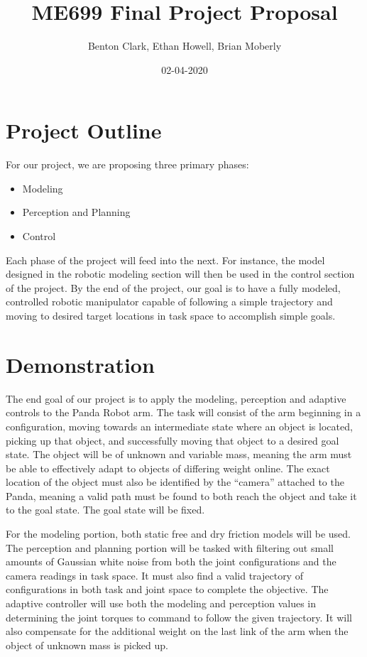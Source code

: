\documentclass{article}
\title{ME699 Final Project Proposal}
\date{02-04-2020}
\author{Benton Clark, Ethan Howell, Brian Moberly}
\begin{document}
\maketitle

\section{Project Outline}
For our project, we are proposing three primary phases:

\begin{itemize}
  \item Modeling
  \item Perception and Planning
  \item Control
\end{itemize}

\noindent Each phase of the project will feed into the next.
For instance, the model designed in the robotic modeling section will then be
used in the control section of the project.
By the end of the project, our goal is to have a fully modeled, controlled
robotic manipulator capable of following a simple trajectory and moving to
desired target locations in task space to accomplish simple goals.

\section{Demonstration}
The end goal of our project is to apply the modeling, perception and adaptive
controls to the Panda Robot arm.
The task will consist of the arm beginning in a configuration, moving towards an
intermediate state where an object is located, picking up that object, and
successfully moving that object to a desired goal state.
The object will be of unknown and variable mass, meaning the arm must be able to
effectively adapt to objects of differing weight online.
The exact location of the object must also be identified by the ``camera''
attached to the Panda, meaning a valid path must be found to both reach the
object and take it to the goal state.
The goal state will be fixed.

For the modeling portion, both static free and dry friction models will be used.
The perception and planning portion will be tasked with filtering out small
amounts of Gaussian white noise from both the joint configurations and the
camera readings in task space.
It must also find a valid trajectory of configurations in both task and joint
space to complete the objective.
The adaptive controller will use both the modeling and perception values in
determining the joint torques to command to follow the given trajectory.
It will also compensate for the additional weight on the last link of the arm
when the object of unknown mass is picked up.
\end{document}
